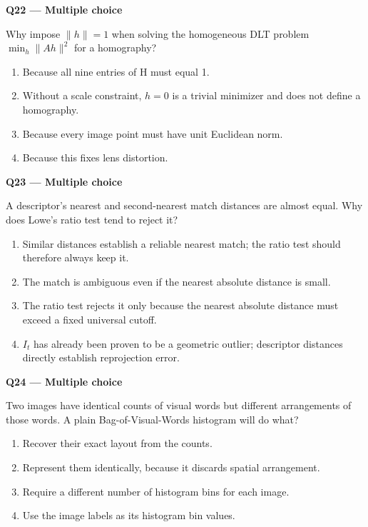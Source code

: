 \documentclass[11pt,a4paper]{article}
\begin{document}
\par\vspace{12pt}
\begin{minipage}{\linewidth}
\textbf{Q22 — Multiple choice}\par\smallskip
Why impose \(\lVert h\rVert=1\) when solving the homogeneous DLT problem \(\min_h\lVert Ah\rVert^2\) for a homography?
\begin{enumerate}[label=\textbf{\Alph*.}]
\item Because all nine entries of H must equal 1.
\item Without a scale constraint,\allowbreak{} \(h=0\) is a trivial minimizer and does not define a homography.
\item Because every image point must have unit Euclidean norm.
\item Because this fixes lens distortion.
\end{enumerate}
\end{minipage}
\par\vspace{12pt}
\begin{minipage}{\linewidth}
\textbf{Q23 — Multiple choice}\par\smallskip
A descriptor's nearest and second-nearest match distances are almost equal. Why does Lowe's ratio test tend to reject it?
\begin{enumerate}[label=\textbf{\Alph*.}]
\item Similar distances establish a reliable nearest match; the ratio test should therefore always keep it.
\item The match is ambiguous even if the nearest absolute distance is small.
\item The ratio test rejects it only because the nearest absolute distance must exceed a fixed universal cutoff.
\item \(I_t\) has already been proven to be a geometric outlier; descriptor distances directly establish reprojection error.
\end{enumerate}
\end{minipage}
\par\vspace{12pt}
\begin{minipage}{\linewidth}
\textbf{Q24 — Multiple choice}\par\smallskip
Two images have identical counts of visual words but different arrangements of those words. A plain Bag-of-Visual-Words histogram will do what?
\begin{enumerate}[label=\textbf{\Alph*.}]
\item Recover their exact layout from the counts.
\item Represent them identically,\allowbreak{} because it discards spatial arrangement.
\item Require a different number of histogram bins for each image.
\item Use the image labels as its histogram bin values.
\end{enumerate}
\end{minipage}
\end{document}
